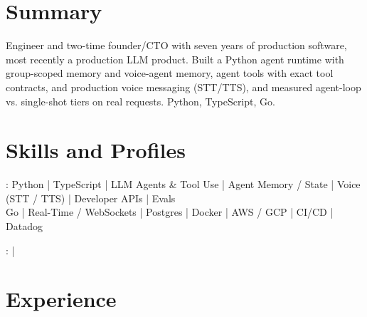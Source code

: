 \documentclass[print]{jack-resume}
\begin{document}
\pagecolor{darkmodeBackground}


\begin{minipage}[t][1cm][t]{.03\textwidth}
    \hfill
\end{minipage}

\section{Summary}
Engineer and two-time founder/CTO with seven years of production software, most recently a production LLM product. Built a Python agent runtime with group-scoped memory and voice-agent memory, agent tools with exact tool contracts, and production voice messaging (STT/TTS), and measured agent-loop vs. single-shot tiers on real requests. Python, TypeScript, Go.
\sectionsep

\section{Skills and Profiles}
:
Python \hfill | \hfill
TypeScript \hfill | \hfill
LLM Agents \& Tool Use \hfill | \hfill
Agent Memory / State \hfill | \hfill
Voice (STT / TTS) \hfill | \hfill
Developer APIs \hfill | \hfill
Evals \\
\hspace{1.0cm} Go \hfill | \hfill
Real-Time / WebSockets \hfill | \hfill
Postgres \hfill | \hfill
Docker \hfill | \hfill
AWS / GCP \hfill | \hfill
CI/CD \hfill | \hfill
Datadog \\

\raggedright{
    :
      \href{https://www.linkedin.com/in/jack-sturtevant/}{ \ExternalLink} |
     \href{https://github.com/jacksturt}{ \ExternalLink}}

\section{Experience}
\end{document}
